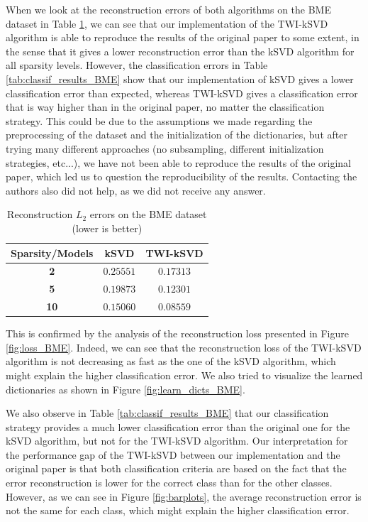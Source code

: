 \documentclass[11pt]{article}
\begin{document}
When we look at the reconstruction errors of both algorithms on the BME dataset in Table \ref{tab:reconstruction_results_BME}, we can see that our implementation of the TWI-kSVD algorithm is able to reproduce the results of the original paper to some extent, in the sense that it gives a lower reconstruction error than the kSVD algorithm for all sparsity levels. However, the classification errors in Table \ref{tab:classif_results_BME} show that our implementation of kSVD gives a lower classification error than expected, whereas TWI-kSVD gives a classification error that is way higher than in the original paper, no matter the classification strategy. This could be due to the assumptions we made regarding the preprocessing of the dataset and the initialization of the dictionaries, but after trying many different approaches (no subsampling, different initialization strategies, etc...), we have not been able to reproduce the results of the original paper, which led us to question the reproducibility of the results. Contacting the authors also did not help, as we did not receive any answer.

\begin{table}[!ht]
    \centering
        \begin{tabular}{ccc}
            \toprule
            \textbf{Sparsity/Models} & \textbf{kSVD} & \textbf{TWI-kSVD} \\
            \midrule
            \textbf{2} & $0.25551$ & $0.17313$ \\
            \textbf{5} & $0.19873$ & $0.12301$ \\
            \textbf{10} & $\bm{0.15060}$ & $\bm{0.08559}$ \\
            \bottomrule
        \end{tabular}
    \caption{Reconstruction $L_2$ errors on the BME dataset (lower is better)}
    \label{tab:reconstruction_results_BME}
\end{table}

This is confirmed by the analysis of the reconstruction loss presented in Figure \ref{fig:loss_BME}. Indeed, we can see that the reconstruction loss of the TWI-kSVD algorithm is not decreasing as fast as the one of the kSVD algorithm, which might explain the higher classification error. We also tried to visualize the learned dictionaries as shown in Figure \ref{fig:learn_dicts_BME}. 

We also observe in Table \ref{tab:classif_results_BME} that our classification strategy provides a much lower classification error than the original one for the kSVD algorithm, but not for the TWI-kSVD algorithm. Our interpretation for the performance gap of the TWI-kSVD between our implementation and the original paper is that both classification criteria are based on the fact that the error reconstruction is lower for the correct class than for the other classes. However, as we can see in Figure \ref{fig:barplots}, the average reconstruction error is not the same for each class, which might explain the higher classification error.
\end{document}
